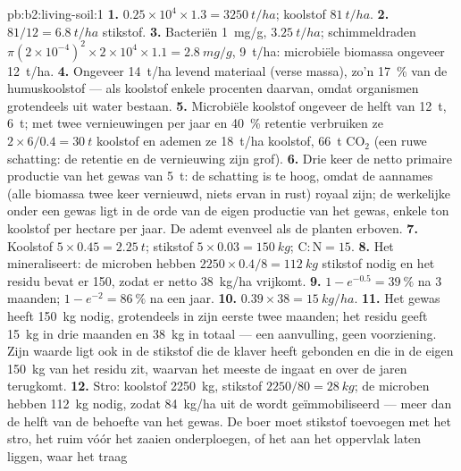 \begin{solution}{pb:b2:living-soil:1}
\textbf{1.} $0.25\times 10^{4}\times 1.3 = \qty{3250}{t/ha}$;
koolstof $\qty{81}{t/ha}$.
\textbf{2.} $81/12 = \qty{6.8}{t/ha}$ stikstof.
\textbf{3.} Bacteriën \qty{1}{mg/g}, $\qty{3.25}{t/ha}$; schimmeldraden
$\pi(2\times 10^{-4})^{2}\times 2\times 10^{4}\times 1.1 =
\qty{2.8}{mg/g}$, \qty{9}{t/ha}: microbiële biomassa ongeveer
\qty{12}{t/ha}.
\textbf{4.} Ongeveer \qty{14}{t/ha} levend materiaal (verse massa),
zo'n \qty{17}{\%} van de humuskoolstof --- als koolstof enkele procenten
daarvan, omdat organismen grotendeels uit water bestaan.
\textbf{5.} Microbiële koolstof ongeveer de helft van \qty{12}{t}, \qty{6}{t};
met twee vernieuwingen per jaar en \qty{40}{\%} retentie verbruiken ze
$2\times 6/0.4 = \qty{30}{t}$ koolstof en ademen ze \qty{18}{t/ha}
koolstof, \qty{66}{t} $\mathrm{CO_2}$ (een ruwe schatting: de
retentie en de vernieuwing zijn grof).
\textbf{6.} Drie keer de netto primaire productie van het gewas van
\qty{5}{t}: de schatting is te hoog, omdat de aannames (alle
biomassa twee keer vernieuwd, niets ervan in rust) royaal zijn;
de werkelijke  onder een gewas ligt in de orde van de
eigen productie van het gewas, enkele ton koolstof per hectare per jaar. De
 ademt evenveel als de planten erboven.
\textbf{7.} Koolstof $5\times 0.45 = \qty{2.25}{t}$; stikstof $5\times
0.03 = \qty{150}{kg}$; $\mathrm{C:N} = 15$.
\textbf{8.} Het mineraliseert: de microben hebben $2250\times 0.4/8 =
\qty{112}{kg}$ stikstof nodig en het residu bevat er 150, zodat er netto
\qty{38}{kg/ha} vrijkomt.
\textbf{9.} $1 - e^{-0.5} = \qty{39}{\%}$ na 3 maanden; $1 - e^{-2}
= \qty{86}{\%}$ na een jaar.
\textbf{10.} $0.39\times 38 = \qty{15}{kg/ha}$.
\textbf{11.} Het gewas heeft \qty{150}{kg} nodig, grotendeels in zijn eerste
twee maanden; het residu geeft \qty{15}{kg} in drie maanden en
\qty{38}{kg} in totaal --- een aanvulling, geen voorziening. Zijn waarde ligt
ook in de stikstof die de klaver heeft gebonden en die in de eigen
\qty{150}{kg} van het residu zit, waarvan het meeste de  ingaat en
over de jaren terugkomt.
\textbf{12.} Stro: koolstof \qty{2250}{kg}, stikstof $2250/80 =
\qty{28}{kg}$; de microben hebben \qty{112}{kg} nodig, zodat \qty{84}{kg/ha}
uit de  wordt geïmmobiliseerd --- meer dan de helft van de behoefte van
het gewas. De boer moet stikstof toevoegen met het stro, het ruim vóór het
zaaien onderploegen, of het aan het oppervlak laten liggen, waar het traag

\end{solution}
